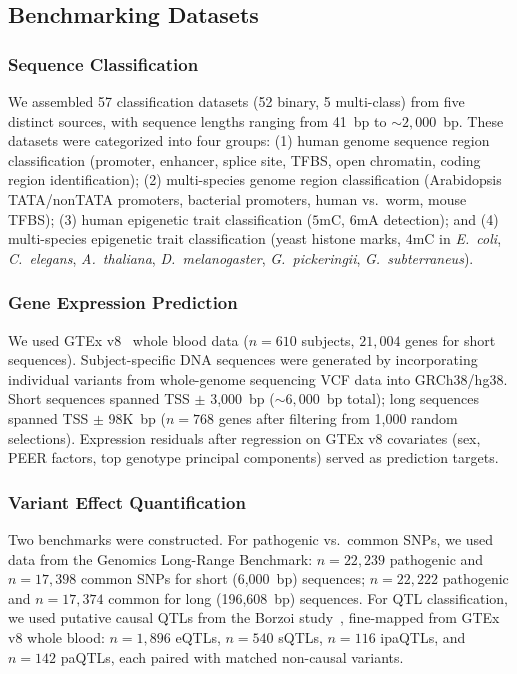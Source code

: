 \documentclass[11pt]{article}
\begin{document}
\subsection{Benchmarking Datasets}

\subsubsection{Sequence Classification}
We assembled 57 classification datasets (52 binary, 5 multi-class) from five distinct sources, with sequence lengths ranging from 41~bp to ${\sim}2{,}000$~bp. These datasets were categorized into four groups: (1) human genome sequence region classification (promoter, enhancer, splice site, TFBS, open chromatin, coding region identification); (2) multi-species genome region classification (Arabidopsis TATA/nonTATA promoters, bacterial promoters, human vs.\ worm, mouse TFBS); (3) human epigenetic trait classification ($5$mC, $6$mA detection); and (4) multi-species epigenetic trait classification (yeast histone marks, $4$mC in \textit{E.\ coli}, \textit{C.\ elegans}, \textit{A.\ thaliana}, \textit{D.\ melanogaster}, \textit{G.\ pickeringii}, \textit{G.\ subterraneus}).

\subsubsection{Gene Expression Prediction}
We used GTEx v8~\citep{gtex2020atlas} whole blood data ($n = 610$ subjects, $21{,}004$ genes for short sequences). Subject-specific DNA sequences were generated by incorporating individual variants from whole-genome sequencing VCF data into GRCh38/hg38. Short sequences spanned TSS $\pm$ 3,000~bp (${\sim}6{,}000$~bp total); long sequences spanned TSS $\pm$ 98K~bp ($n = 768$ genes after filtering from 1,000 random selections). Expression residuals after regression on GTEx v8 covariates (sex, PEER factors, top genotype principal components) served as prediction targets.

\subsubsection{Variant Effect Quantification}
Two benchmarks were constructed. For pathogenic vs.\ common SNPs, we used data from the Genomics Long-Range Benchmark: $n = 22{,}239$ pathogenic and $n = 17{,}398$ common SNPs for short (6,000~bp) sequences; $n = 22{,}222$ pathogenic and $n = 17{,}374$ common for long (196,608~bp) sequences. For QTL classification, we used putative causal QTLs from the Borzoi study~\citep{linder2023borzoi}, fine-mapped from GTEx v8 whole blood: $n = 1{,}896$ eQTLs, $n = 540$ sQTLs, $n = 116$ ipaQTLs, and $n = 142$ paQTLs, each paired with matched non-causal variants.
\end{document}

